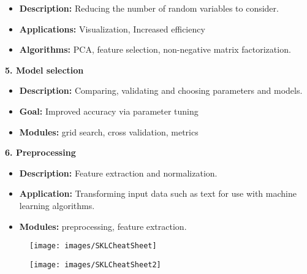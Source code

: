 \documentclass[SKL-MASTER.tex]{subfiles}
\begin{document}
\begin{itemize}
	\item \noindent \textbf{Description: } Reducing the number of random variables to consider.
	\item \noindent \textbf{Applications:} Visualization, Increased efficiency
	\item \noindent \textbf{Algorithms:} PCA, feature selection, non-negative matrix factorization. 
\end{itemize}
\bigskip
\noindent \textbf{5. Model selection}
\begin{itemize}
	\item \noindent \textbf{Description: } Comparing, validating and choosing parameters and models.
	\item \noindent \textbf{Goal:} Improved accuracy via parameter tuning
	\item \noindent \textbf{Modules:} grid search, cross validation, metrics
\end{itemize}
\bigskip
\noindent \textbf{6. Preprocessing}
\begin{itemize}
	\item \noindent \textbf{Description:} Feature extraction and normalization.
	\item \noindent \textbf{Application:} Transforming input data such as text for use with machine learning algorithms.
	\item \noindent \textbf{Modules:} preprocessing, feature extraction.
\end{itemize}
\newpage
\begin{figure}[h!]
\centering
\texttt{[image: images/SKLCheatSheet]}

\end{figure}
\newpage
\begin{figure}[h!]
	\centering
	\texttt{[image: images/SKLCheatSheet2]}

\end{figure}
\end{document}
